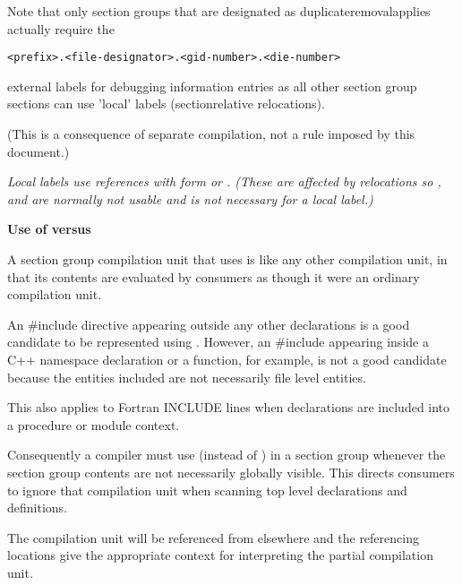 Note that only section groups that are designated as
duplicate\dash removal\dash applies actually require the
\begin{alltt}
    <prefix>.<file-designator>.<gid-number>.<die-number>
\end{alltt}
external labels for debugging information entries as all other
section group sections can use 'local' labels 
(section\dash relative
relocations).

(This is a consequence of separate compilation, not a rule
imposed by this document.)

\textit{Local labels use references with form 
or 
. 
(These are affected by relocations
so 
, 
 and 
 are
normally not usable and 
 is not necessary
for a local label.)}

\textbf{Use of  versus 
}

A section group compilation unit that uses 
is like any other compilation unit, in that its contents
are evaluated by consumers as though it were an ordinary
compilation unit.

An \#include directive appearing outside any other
declarations is a good candidate to be represented using
. 
However, an \#include appearing inside
a C++ namespace declaration or a function, for example, is
not a good candidate because the entities included are not
necessarily file level entities.

This also applies to Fortran INCLUDE lines when declarations
are included into a procedure or module context.

Consequently a compiler must use  (instead
of ) in a section group whenever the section
group contents are not necessarily globally visible. This
directs consumers to ignore that compilation unit when scanning
top level declarations and definitions.

The  compilation unit will be referenced
from elsewhere and the referencing locations give the
appropriate context for interpreting the partial compilation
unit.

